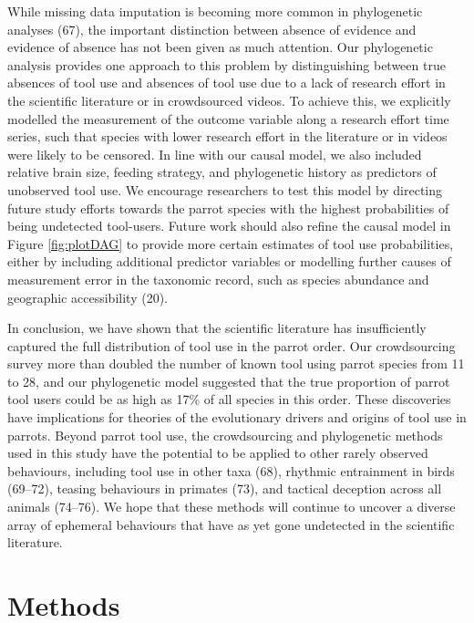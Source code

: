 \documentclass[
  man, donotrepeattitle,floatsintext]{apa6}
\begin{document}
While missing data imputation is becoming more common in phylogenetic
analyses (67), the important distinction between absence of
evidence and evidence of absence has not been given as much attention. Our
phylogenetic analysis provides one approach to this problem by distinguishing
between true absences of tool use and absences of tool use due to a lack of
research effort in the scientific literature or in crowdsourced videos. To
achieve this, we explicitly modelled the measurement of the outcome variable
along a research effort time series, such that species with lower research
effort in the literature or in videos were likely to be censored. In line with
our causal model, we also included relative brain size, feeding strategy, and
phylogenetic history as predictors of unobserved tool use. We encourage
researchers to test this model by directing future study efforts towards the
parrot species with the highest probabilities of being undetected tool-users.
Future work should also refine the causal model in Figure \ref{fig:plotDAG} to
provide more certain estimates of tool use probabilities, either by including
additional predictor variables or modelling further causes of measurement error
in the taxonomic record, such as species abundance and geographic
accessibility (20).

In conclusion, we have shown that the scientific literature has insufficiently
captured the full distribution of tool use in the parrot order. Our
crowdsourcing survey more than doubled the number of known tool using parrot
species from 11 to 28, and our phylogenetic model suggested that the true
proportion of parrot tool users could be as high as 17\% of all species in this
order. These discoveries have implications for theories of the evolutionary
drivers and origins of tool use in parrots. Beyond parrot tool use, the
crowdsourcing and phylogenetic methods used in this study have the potential to
be applied to other rarely observed behaviours, including tool use in other
taxa (68), rhythmic entrainment in birds (69--72), teasing behaviours in primates (73), and
tactical deception across all animals (74--76).
We hope that these methods will continue to uncover a diverse array of ephemeral
behaviours that have as yet gone undetected in the scientific literature.

\hypertarget{methods}{%
\section{Methods}\label{methods}}
\end{document}
